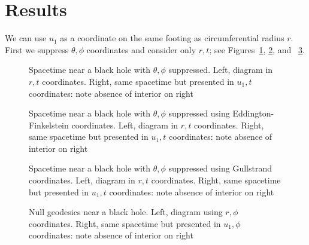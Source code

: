 \documentclass{article}
\begin{document}
\section{Results}

We can use $u_1$ as a coordinate on the same footing as
circumferential radius $r$.  First we suppress $\theta,\phi$
coordinates and consider only $r,t$; see Figures~\ref{schwarzschild},
\ref{eddington}, and ~\ref{gullstrand}.

\begin{figure}%
    \centering
    \caption{Spacetime near a black hole with $\theta,\phi$
      suppressed.  Left, diagram in $r,t$ coordinates.  Right, same
      spacetime but presented in $u_1,t$ coordinates: note absence of interior on right}
    \label{schwarzschild}%
\end{figure}

\begin{figure}%
    \centering
    \caption{Spacetime near a black hole with $\theta,\phi$ suppressed
      using Eddington-Finkelstein coordinates.  Left, diagram in $r,t$
      coordinates.  Right, same spacetime but presented in $u_1,t$
      coordinates: note absence of interior on right}
    \label{eddington}%
\end{figure}

\begin{figure}%
    \centering
    \caption{Spacetime near a black hole with $\theta,\phi$ suppressed
      using Gullstrand coordinates.  Left, diagram in $r,t$
      coordinates.  Right, same spacetime but presented in $u_1,t$
      coordinates: note absence of interior on right}
    \label{gullstrand}%
\end{figure}

\begin{figure}%
    \centering
    \caption{Null geodesics near a black hole.  Left, diagram using $r,\phi$
      coordinates.  Right, same spacetime but presented in $u_1,\phi$
      coordinates: note absence of interior on right}
    \label{light_2}%
\end{figure}
\end{document}
